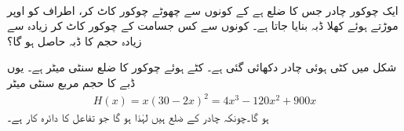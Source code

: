 
\\
 ایک چوکور چادر جس کا ضلع  ہے کے کونوں سے چھوٹے چوکور کاٹ کر، اطراف کو اوپر موڑتے ہوئے کھلا ڈبہ بنایا جاتا ہے۔ کونوں سے کس جسامت کے چوکور کاٹ کر زیادہ سے زیادہ حجم کا ڈبہ حاصل ہو گا؟

شکل  میں کٹی ہوئی چادر دکھائی گئی ہے۔ کٹے ہوئے چوکور کا ضلع  سنٹی میٹر ہے۔ یوں ڈبے کا حجم  مربع سنٹی میٹر 
\begin{align*}
H(x)=x(30-2x)^2=4x^3-120x^2+900x
\end{align*}
ہو گا۔چونکہ چادر کے  ضلع  ہیں لہٰذا  ہو گا جو تفاعل  کا دائرہ کار ہے۔

